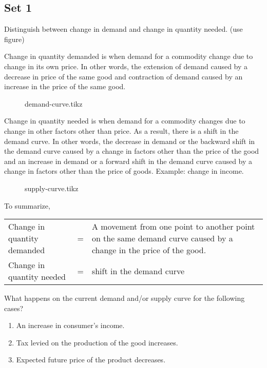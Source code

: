 \documentclass[12pt]{article}
\begin{document}
\subsection{Set 1}
\begin{prob}
	Distinguish between change in demand and change in quantity needed. (use figure)
\end{prob}
\begin{soln}
	Change in quantity demanded is when demand for a commodity change due to change in its own price. In other words, the extension of demand caused by a decrease in price of the same good and contraction of demand caused by an increase in the price of the same good.
	\begin{figure}[H]
		\centering
		\vspace{-0.25cm}
		{demand-curve.tikz}
		\vspace{-0.5cm}
	\end{figure}

	Change in quantity needed is when demand for a commodity changes due to change in other factors other than price. As a result, there is a shift in the demand curve. In other words, the decrease in demand or the backward shift in the demand curve caused by a change in factors other than the price of the good and an increase in demand or a forward shift in the demand curve caused by a change in factors other than the price of goods. Example: change in income.
	\begin{figure}[H]
		\vspace{-0.25cm}
		\centering
		{supply-curve.tikz}
		\vspace{-1cm}
	\end{figure}
	To summarize,
	\begin{table}[H]
		\begin{tabular}{lcp{12cm}}
			Change in quantity demanded & = & A movement from one point to another point on the same demand curve caused by a change in the price of the good. \\
			Change in quantity needed   & = & shift in the demand curve
		\end{tabular}
	\end{table}
\end{soln}
\newpage
\begin{prob}
	What happens on the current demand and/or supply curve for the following cases?
	\begin{enumerate}[label=(\alph*)]
		\item An increase in consumer's income.
		\item Tax levied on the production of the good increases.
		\item Expected future price of the product decreases.
	\end{enumerate}
\end{prob}
\end{document}
